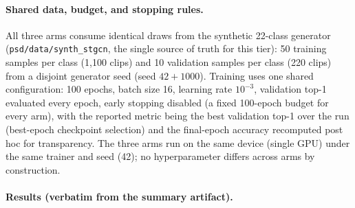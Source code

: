 \documentclass[11pt,a4paper]{article}
\begin{document}
\paragraph{Shared data, budget, and stopping rules.}
All three arms consume identical draws from the synthetic 22-class generator (\texttt{psd/data/synth\_stgcn}, the single source of truth for this tier): 50 training samples per class (1{,}100 clips) and 10 validation samples per class (220 clips) from a disjoint generator seed (seed $42+1000$). Training uses one shared configuration: 100 epochs, batch size 16, learning rate $10^{-3}$, validation top-1 evaluated every epoch, early stopping disabled (a fixed 100-epoch budget for every arm), with the reported metric being the best validation top-1 over the run (best-epoch checkpoint selection) and the final-epoch accuracy recomputed post hoc for transparency. The three arms run on the same device (single GPU) under the same trainer and seed (42); no hyperparameter differs across arms by construction.

\paragraph{Results (verbatim from the summary artifact).}
\begin{center}
%
\end{center}
\end{document}

